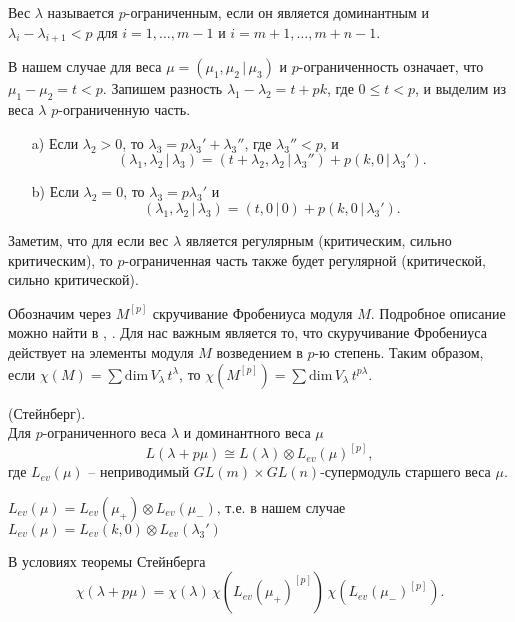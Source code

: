 \begin{definition}
Вес $ \lambda $ называется $p$-ограниченным, если он является доминантным и $ \lambda_i - \lambda_{i + 1} < p $ 
для $ i = 1, \ldots, m - 1 $ и $ i = m + 1, \ldots, m + n - 1 $.
\end{definition}
%
В нашем случае для веса $ \mu = (\mu_1, \mu_2 \,|\, \mu_3) $ и $p$-ограниченность означает, что $ \mu_1 - \mu_2 = t < p $.
Запишем разность $ \lambda_1 - \lambda_2 = t + pk $, где $ 0 \leq t < p $, и выделим из веса $ \lambda $ $p$-ограниченную часть.
\begin{enumerate}
\item [a)] Если $ \lambda_2 > 0 $, то $ \lambda_3 = p \lambda_3 ' + \lambda_3 '' $, где $ \lambda_3 '' < p $, и
$$
(\lambda_1, \lambda_2 \,|\, \lambda_3) = (t + \lambda_2, \lambda_2 \,|\, \lambda_3 '') + p (k, 0 \,|\, \lambda_3 ').
$$
\item [b)] Если $ \lambda_2 = 0 $, то $ \lambda_3 = p \lambda_3 ' $ и
$$
(\lambda_1, \lambda_2 \,|\, \lambda_3) = (t, 0 \,|\, 0) + p (k, 0 \,|\, \lambda_3 ').
$$
\end{enumerate}

Заметим, что для если вес $\lambda$ является регулярным (критическим, сильно критическим), 
то $p$-ограниченная часть также будет регулярной (критической, сильно критической).

Обозначим через $M^{[p]}$ скручивание Фробениуса модуля $M$. Подробное описание можно найти в \cite{donkin}, \cite{steinberg_theorem}.
Для нас важным является то, что скуручивание Фробениуса действует на элементы модуля $M$ возведением в $p$-ю степень.
Таким образом, если $ \chi(M) = \sum \mbox{dim}\,V_{\lambda} \, t^{\lambda} $, то $ \chi (M^{[p]}) = \sum \mbox{dim}\,V_{\lambda} \, t^{p\lambda} $.

\begin{theorem} (Стейнберг).\\
Для $p$-ограниченного веса $\lambda$ и доминантного веса $\mu$
$$ L(\lambda + p\mu) \cong L(\lambda) \otimes L_{ev}(\mu)^{[p]}, $$
где $ L_{ev}(\mu) $ -- неприводимый $ GL(m) \times GL(n) $-супермодуль старшего веса $\mu$. 
\end{theorem}

$ L_{ev}(\mu) = L_{ev}(\mu_+) \otimes L_{ev}(\mu_-) $, т.е. в нашем случае $ L_{ev}(\mu) = L_{ev}(k, 0) \otimes L_{ev}(\lambda_3 ') $

\begin{corollary}
В условиях теоремы Стейнберга 
$$ \chi(\lambda + p\mu) = \chi(\lambda) \, \chi(L_{ev}(\mu_+)^{[p]}) \, \chi(L_{ev}(\mu_-)^{[p]}). $$
\end{corollary}
